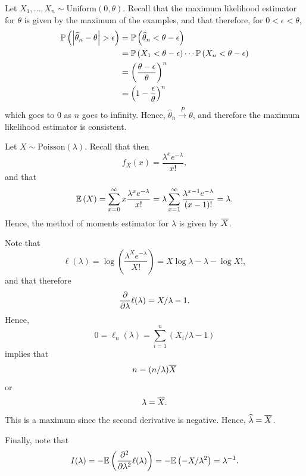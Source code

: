 \begin{ex}
  Let $X_1,\ldots,X_n\sim\text{Uniform}(0,\theta)$. Recall that the maximum
  likelihood estimator for $\theta$ is given by the maximum of the examples, and
  that therefore, for $0<\epsilon<\theta$,
  \begin{align*}
    \P{\left|\widehat{\theta}_n-\theta\right|>\epsilon}
     & =\P{\widehat{\theta}_n < \theta-\epsilon}                 \\
     & =\P{X_1 < \theta-\epsilon}\cdots\P{X_n < \theta-\epsilon} \\
     & =\left(\frac{\theta-\epsilon}{\theta}\right)^n            \\
     & =\left(1-\frac{\epsilon}{\theta}\right)^n
  \end{align*}
  which goes to $0$ as $n$ goes to infinity. Hence,
  $\widehat{\theta}_n\xrightarrow{P} \theta$, and therefore the maximum
  likelihood estimator is consistent.
\end{ex}

\begin{ex}
  Let $X\sim\text{Poisson}(\lambda)$. Recall that then
  \[
    f_X(x)=\frac{\lambda^x e^{-\lambda}}{x!},
  \]
  and that
  \[
    \mathbb{E}\left(X\right)
    =\sum_{x=0}^\infty x\frac{\lambda^x e^{-\lambda}}{x!}
    =\lambda\sum_{x=1}^\infty \frac{\lambda^{x-1} e^{-\lambda}}{(x-1)!}
    =\lambda.
  \]
  Hence, the method of moments estimator for $\lambda$ is given by $\overline{X}$.

  Note that
  \[
    \ell(\lambda)
    =\log\left(\frac{\lambda^X e^{-\lambda}}{X!}\right)
    =X\log{\lambda}-\lambda-\log{X!},
  \]
  and that therefore
  \[
    \frac{\partial}{\partial\lambda}\ell(\lambda)
    =X/\lambda-1.
  \]
  Hence,
  \[
    0=\ell_n(\lambda)=\sum_{i=1}^n(X_i/\lambda -1)
  \]
  implies that
  \[
    n=(n/\lambda)\overline{X}
  \]
  or
  \[
    \lambda=\overline{X}.
  \]
  This is a maximum since the second derivative is negative. Hence,
  $\widehat{\lambda}=\overline{X}$.

  Finally, note that
  \[
    I(\lambda)=-\mathbb{E}\left(\frac{\partial^2}{\partial\lambda^2}\ell(\lambda)\right)
    =-\mathbb{E}\left(-X/\lambda^2\right)=\lambda^{-1}.
  \]
\end{ex}

